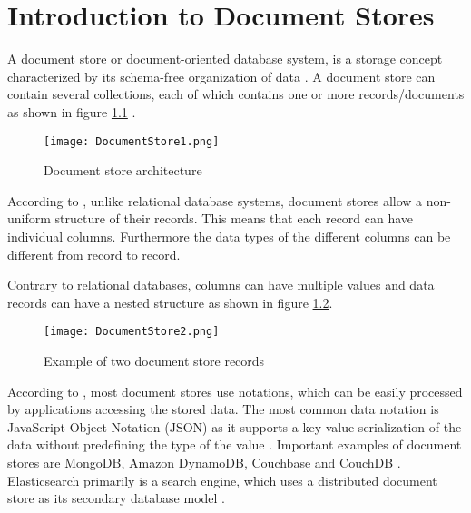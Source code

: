 \chapter{Introduction to Document Stores}

A document store or document-oriented database system, is a storage concept characterized by its schema-free organization of data \autocite{solidit2019}. 
A document store can contain several collections, each of which contains one or more records/documents as shown in figure \ref{fig:docstore1} \autocite{mongodb2019}.

\begin{figure}[ht]
    \centering
    \texttt{[image: DocumentStore1.png]}
    \caption{Document store architecture}
    \label{fig:docstore1}
\end{figure}

According to \autocite{solidit2019}, unlike relational database systems, document stores allow a non-uniform structure of their records. This means that each record can have individual columns. Furthermore the data types of the different columns can be different from record to record. 

Contrary to relational databases, columns can have multiple values and data records can have a nested structure as shown in figure \ref{fig:docstore2}.

\begin{figure}[ht]
    \centering
    \texttt{[image: DocumentStore2.png]}
    \caption{Example of two document store records \autocite{buckenhofera.2019}}
    \label{fig:docstore2}
\end{figure}

According to \autocite{solidit2019}, most document stores use notations, which can be easily processed by applications accessing the stored data. The most common data notation is JavaScript Object Notation (JSON) as it supports a key-value serialization of the data without predefining the type of the value \autocite{elastic2019}.
Important examples of document stores are MongoDB, Amazon DynamoDB, Couchbase and CouchDB \autocite{solidit2019}. Elasticsearch primarily is a search engine, which uses a distributed document store as its secondary database model \autocite{solidit2019_02}.


